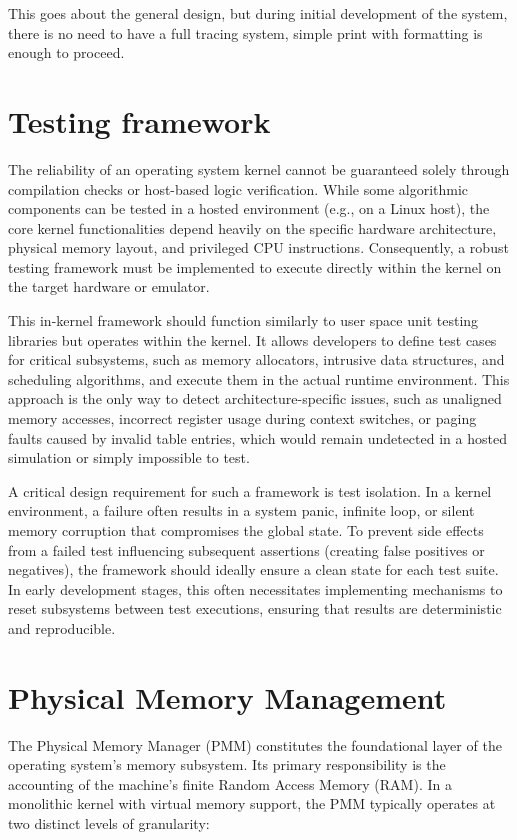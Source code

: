 \documentclass[a4paper,10pt,twoside]{report}
\theoremstyle{definition}
\begin{document}
This goes about the general design, but during initial development of the system, there is no need to have a full tracing system, simple print with formatting is enough to proceed.

\section{Testing framework}
\label{sec:testing}

The reliability of an operating system kernel cannot be guaranteed solely through compilation checks or host-based logic verification. While some algorithmic components can be tested in a hosted environment (e.g., on a Linux host), the core kernel functionalities depend heavily on the specific hardware architecture, physical memory layout, and privileged CPU instructions. Consequently, a robust testing framework must be implemented to execute directly within the kernel on the target hardware or emulator.

This in-kernel framework should function similarly to user space unit testing libraries but operates within the kernel. It allows developers to define test cases for critical subsystems, such as memory allocators, intrusive data structures, and scheduling algorithms, and execute them in the actual runtime environment. This approach is the only way to detect architecture-specific issues, such as unaligned memory accesses, incorrect register usage during context switches, or paging faults caused by invalid table entries, which would remain undetected in a hosted simulation or simply impossible to test.

A critical design requirement for such a framework is test isolation. In a kernel environment, a failure often results in a system panic, infinite loop, or silent memory corruption that compromises the global state. To prevent side effects from a failed test influencing subsequent assertions (creating false positives or negatives), the framework should ideally ensure a clean state for each test suite. In early development stages, this often necessitates implementing mechanisms to reset subsystems between test executions, ensuring that results are deterministic and reproducible.

\section{Physical Memory Management}
\label{subsubsec:physical_memory_management}

The Physical Memory Manager (PMM) constitutes the foundational layer of the operating system's memory subsystem. Its primary responsibility is the accounting of the machine's finite Random Access Memory (RAM). In a monolithic kernel with virtual memory support, the PMM typically operates at two distinct levels of granularity:
\end{document}
